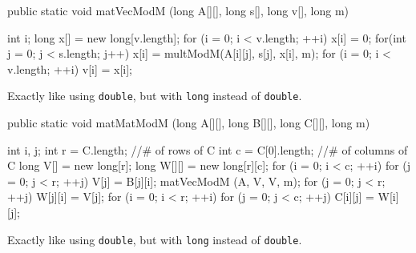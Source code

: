 \begin{htmlonly}
\end{htmlonly}
\begin{code}

   public static void matVecModM (long A[][], long s[], long v[], long m) \begin{hide} {
      int i;
      long x[] = new long[v.length];
      for (i = 0; i < v.length;  ++i) {
         x[i] = 0;
         for(int j = 0; j < s.length; j++)
            x[i] = multModM(A[i][j], s[j], x[i], m);
      }
      for (i = 0; i < v.length;  ++i)
         v[i] = x[i];

   } \end{hide}
\end{code}
\begin{tabb} Exactly like  using \texttt{double}, but with \texttt{long} instead 
  of \texttt{double}.
\end{tabb}
\begin{htmlonly}
\end{htmlonly}
\begin{code}

   public static void matMatModM (long A[][], long B[][], long C[][], long m) \begin{hide} {
      int i, j;
      int r = C.length;    //# of rows of C
      int c = C[0].length; //# of columns of C
      long V[] = new long[r];
      long W[][] = new long[r][c];
      for (i = 0; i < c;  ++i) {
         for (j = 0; j < r;  ++j)
            V[j] = B[j][i];
         matVecModM (A, V, V, m);
         for (j = 0; j < r;  ++j)
            W[j][i] = V[j];
      }
      for (i = 0; i < r;  ++i) {
         for (j = 0; j < c;  ++j)
            C[i][j] = W[i][j];
      }
   } \end{hide}
\end{code}
\begin{tabb} Exactly like  using \texttt{double}, but with \texttt{long} instead
  of \texttt{double}.
\end{tabb}
\begin{htmlonly}
\end{htmlonly}
